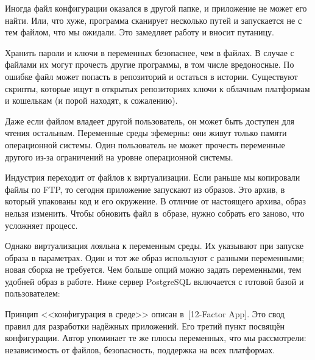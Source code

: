 Иногда файл конфигурации оказался в другой папке, и приложение не может его
найти. Или, что хуже, программа сканирует несколько путей и запускается не с тем
файлом, что мы ожидали. Это замедляет работу и вносит путаницу.

\label{password-note}


Хранить пароли и ключи в переменных безопаснее, чем в файлах. В случае с файлами
их могут прочесть другие программы, в том числе вредоносные. По ошибке файл
может попасть в репозиторий и остаться в истории. Существуют скрипты, которые
ищут в открытых репозиториях ключи к облачным платформам и кошелькам (и порой
находят, к сожалению).

Даже если файлом владеет другой пользователь, он может быть доступен для чтения
остальным. Переменные среды эфемерны: они живут только памяти операционной
системы. Один пользователь не может прочесть переменные другого из-за
ограничений на уровне операционной системы.


Индустрия переходит от файлов к виртуализации. Если раньше мы копировали файлы
по FTP, то сегодня приложение запускают из образов. Это архив, в который
упакованы код и его окружение. В отличие от настоящего архива, образ нельзя
изменить. Чтобы обновить файл в~образе, нужно собрать его заново, что усложняет
процесс.


Однако виртуализация лояльна к переменным среды. Их указывают при запуске образа
в параметрах. Один и тот же образ используют с разными переменными; новая сборка
не требуется. Чем больше опций можно задать переменными, тем удобней образ в
работе. Ниже сервер PostgreSQL включается с готовой базой и пользователем:

\begin{english}
\end{english}


Принцип <<конфигурация в среде>> описан в~[12-Factor App].
Это свод правил для разработки надёжных приложений. Его третий пункт посвящён конфигурации.
Автор упоминает те же плюсы переменных, что мы рассмотрели: независимость от файлов,
безопасность, поддержка на всех платформах.

